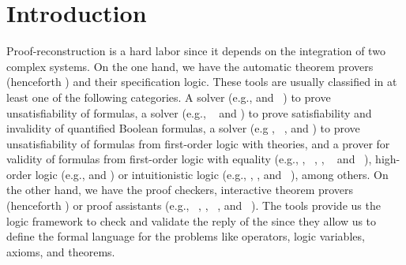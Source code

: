 \documentclass[../main.tex]{subfiles}
\begin{document}

\section{Introduction}
\label{sec:introduction}

Proof-reconstruction is a hard labor since it depends on the
integration of two complex systems. On the one hand, we have the
automatic theorem provers (henceforth \ATP) and their specification
logic. These tools are usually classified in at least one of the
following categories. A \SAT solver (e.g., 
\cite{Moskewicz2001} and ~\cite{Een2004}) to prove
unsatisfiability of \CNF formulas, a  solver (e.g.,
~\cite{Klieber2014} and 
\cite{Lonsing2017}) to prove satisfiability and invalidity of
quantified Boolean formulas, a \SMT solver (e.g 
\cite{Barrett2011}, ~\cite{bouton2009}, and 
\cite{DeMoura2008}) to prove unsatisfiability of formulas from
first-order logic with theories, and a prover for validity of
formulas from first-order logic with equality (e.g., 
\cite{Schulz:AICOM-2002}, ~\cite{Otten2008}, \Metis
\cite{hurd2003first},  ~\cite{Weidenbach2009} and
~\cite{Riazanov1999}), high-order logic (e.g.,
 \cite{Benzmuller2008} and 
\cite{Brown2012}) or intuitionistic logic (e.g., 
\cite{Otten2008},  \cite{Schmitt2001}, and
~\cite{Tammet1997}), among others. On the other hand,
we have the proof checkers, interactive theorem provers (henceforth
\ITP) or proof assistants (e.g., \Agda~\cite{agdateam}, 
\cite{coqteam}, ~\cite{paulson1994isabelle}, and
~\cite{norrish2007hol}). The \ITP tools provide us the
logic framework to check and validate the reply of the \ATPs since
they allow us to define the formal language for the problems like
operators, logic variables, axioms, and theorems.
\end{document}
